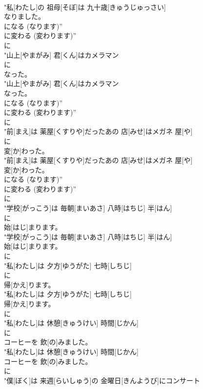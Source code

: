 \documentclass[8pt]{extreport}
\begin{document}
\begin{CJK}{UTF8}{min}
\\	"私[わたし]の 祖母[そぼ]は 九十歳[きゅうじゅっさい]
\\	なりました。
\\	になる (なります)” 
\\	に変わる (変わります)”	
\\	に
\\	"山上[やまがみ] 君[くん]はカメラマン
\\	に
\\	なった。
\\	"山上[やまがみ] 君[くん]はカメラマン
\\	なった。
\\	になる (なります)” 
\\	に変わる (変わります)”	
\\	に
\\	"前[まえ]は 薬屋[くすりや]だったあの 店[みせ]はメガネ 屋[や]
\\	に
\\	変[か]わった。
\\	"前[まえ]は 薬屋[くすりや]だったあの 店[みせ]はメガネ 屋[や]
\\	変[か]わった。
\\	になる (なります)” 
\\	に変わる (変わります)”	
\\	に
\\	"学校[がっこう]は 毎朝[まいあさ] 八時[はちじ] 半[はん]
\\	に
\\	始[はじ]まります。
\\	"学校[がっこう]は 毎朝[まいあさ] 八時[はちじ] 半[はん]
\\	始[はじ]まります。
\\	に
\\	"私[わたし]は 夕方[ゆうがた] 七時[しちじ]
\\	に
\\	帰[かえ]ります。
\\	"私[わたし]は 夕方[ゆうがた] 七時[しちじ]
\\	帰[かえ]ります。
\\	に
\\	"私[わたし]は 休憩[きゅうけい] 時間[じかん]
\\	に
\\	コーヒーを 飲[の]みました。
\\	"私[わたし]は 休憩[きゅうけい] 時間[じかん]
\\	コーヒーを 飲[の]みました。
\\	に
\\	"僕[ぼく]は 来週[らいしゅう]の 金曜日[きんようび]にコンサート

\end{CJK}
\end{document}
